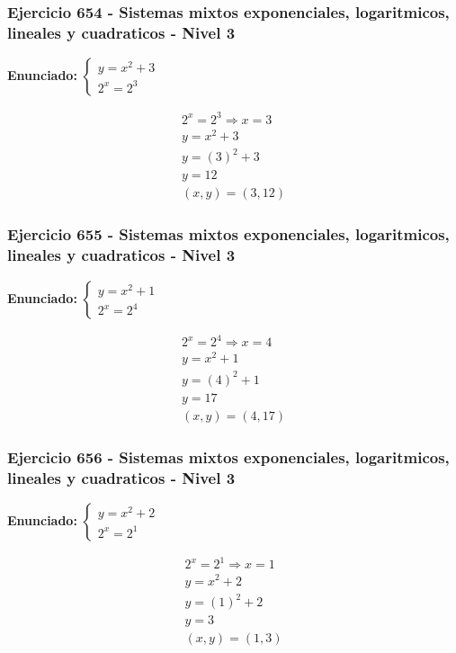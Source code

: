 \documentclass[12pt,a4paper]{article}
\begin{document}
\subsubsection*{Ejercicio 654 - Sistemas mixtos exponenciales, logaritmicos, lineales y cuadraticos - Nivel 3}
\textbf{Enunciado:} \(\begin{cases} y=x^2+3\\ 2^x=2^{3}\end{cases}\)

\[
\begin{aligned}
2^x=2^{3}\Rightarrow x=3\\
y=x^2+3\\
y=(3)^2+3\\
y=12\\
\boxed{(x,y)=(3,12)}
\end{aligned}
\]


\subsubsection*{Ejercicio 655 - Sistemas mixtos exponenciales, logaritmicos, lineales y cuadraticos - Nivel 3}
\textbf{Enunciado:} \(\begin{cases} y=x^2+1\\ 2^x=2^{4}\end{cases}\)

\[
\begin{aligned}
2^x=2^{4}\Rightarrow x=4\\
y=x^2+1\\
y=(4)^2+1\\
y=17\\
\boxed{(x,y)=(4,17)}
\end{aligned}
\]


\subsubsection*{Ejercicio 656 - Sistemas mixtos exponenciales, logaritmicos, lineales y cuadraticos - Nivel 3}
\textbf{Enunciado:} \(\begin{cases} y=x^2+2\\ 2^x=2^{1}\end{cases}\)

\[
\begin{aligned}
2^x=2^{1}\Rightarrow x=1\\
y=x^2+2\\
y=(1)^2+2\\
y=3\\
\boxed{(x,y)=(1,3)}
\end{aligned}
\]
\end{document}
